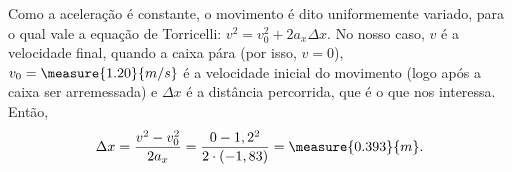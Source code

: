 \begin{question}
\begin{solution}
		Como a aceleração é constante, o movimento é dito uniformemente variado, para o qual vale a equação de Torricelli: $v^2 = v_0^2 + 2 a_x \Delta x$.
		No nosso caso, $v$ é a velocidade final, quando a caixa pára (por isso, $v = 0$), $v_0 = \measure{1.20}{m/s}$ é a velocidade inicial do movimento (logo após a caixa ser arremessada) e $\Delta x$ é a distância percorrida, que é o que nos interessa.
		Então,
		\begin{equation*}
			\Delta x = \frac{v^2 - v_0^2}{2a_x} = \frac{0 - 1,2^2}{2\cdot (-1,83)} = \measure{0.393}{m}.
		\end{equation*}
	\end{solution}
\end{question}

\begin{comment}

```python
from math import *

def to_rad(angle):
	return (angle * pi / 180)

def exercicio_5(v0, g, mu, angle):
	theta = to_rad(angle)
	return(abs(v0**2/(2*g*(sin(theta) + mu * cos(theta)))))
```
\end{comment}